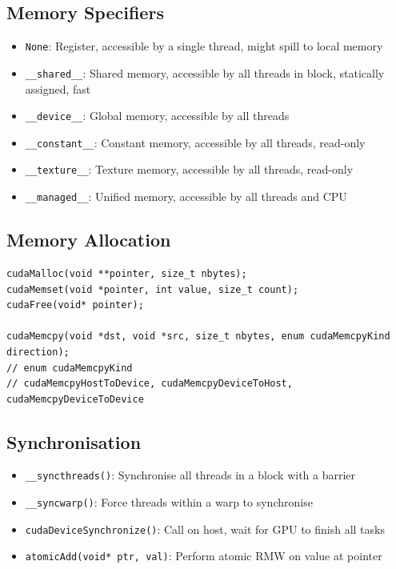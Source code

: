 \documentclass{article}
\begin{document}
\subsection{Memory Specifiers}
\begin{itemize}
    \item \texttt{None}: Register, accessible by a single thread, might spill to local memory
    \item \texttt{\_\_shared\_\_}: Shared memory, accessible by all threads in block, statically assigned, fast
    \item \texttt{\_\_device\_\_}: Global memory, accessible by all threads
    \item \texttt{\_\_constant\_\_}: Constant memory, accessible by all threads, read-only
    \item \texttt{\_\_texture\_\_}: Texture memory, accessible by all threads, read-only
    \item \texttt{\_\_managed\_\_}: Unified memory, accessible by all threads and CPU
\end{itemize}

\subsection{Memory Allocation}
\begin{lstlisting}
cudaMalloc(void **pointer, size_t nbytes);
cudaMemset(void *pointer, int value, size_t count);
cudaFree(void* pointer);

cudaMemcpy(void *dst, void *src, size_t nbytes, enum cudaMemcpyKind direction);
// enum cudaMemcpyKind
// cudaMemcpyHostToDevice, cudaMemcpyDeviceToHost, cudaMemcpyDeviceToDevice
\end{lstlisting}

\subsection{Synchronisation}
\begin{itemize}
    \item \texttt{\_\_syncthreads()}: Synchronise all threads in a block with a barrier
    \item \texttt{\_\_syncwarp()}: Force threads within a warp to synchronise
    \item \texttt{cudaDeviceSynchronize()}: Call on host, wait for GPU to finish all tasks
    \item \texttt{atomicAdd(void* ptr, val)}: Perform atomic RMW on value at pointer
\end{itemize}
\end{document}
